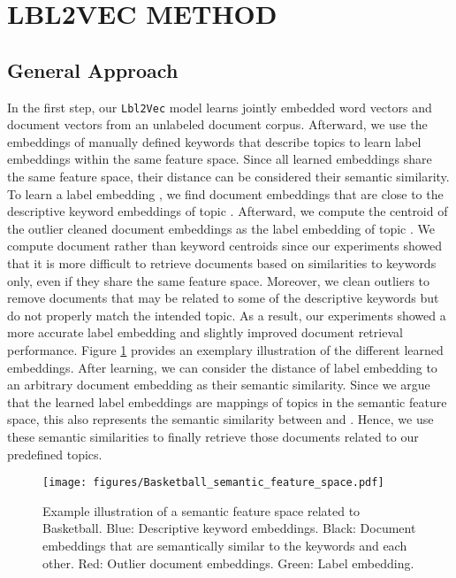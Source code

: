 \documentclass[a4paper,twoside]{article}
\begin{document}
\section{\uppercase{Lbl2Vec Method}}
\label{sec:lbl2vec_method}

\subsection{General Approach}

In the first step, our \texttt{Lbl2Vec} model learns jointly embedded word vectors  and document vectors  from an unlabeled document corpus. Afterward, we use the embeddings  of manually defined keywords that describe topics  to learn label embeddings  within the same feature space. Since all learned embeddings  share the same feature space, their distance can be considered their semantic similarity. To learn a label embedding , we find document embeddings  that are close to the descriptive keyword embeddings  of topic . Afterward, we compute the centroid of the outlier cleaned document embeddings as the label embedding  of topic . We compute document rather than keyword centroids since our experiments showed that it is more difficult to retrieve documents based on similarities to keywords only, even if they share the same feature space. Moreover, we clean outliers to remove documents that may be related to some of the descriptive keywords but do not properly match the intended topic. As a result, our experiments showed a more accurate label embedding and slightly improved document retrieval performance. Figure \ref{fig:basketball_feature_space} provides an exemplary illustration of the different learned embeddings. After learning, we can consider the distance of label embedding  to an arbitrary document embedding  as their semantic similarity. Since we argue that the learned label embeddings are mappings of topics in the semantic feature space, this also represents the semantic similarity between  and . Hence, we use these semantic similarities to finally retrieve those documents related to our predefined topics.
\begin{figure}[ht]
    \centering
    \texttt{[image: figures/Basketball\_semantic\_feature\_space.pdf]}
    \caption{Example illustration of a semantic feature space related to Basketball. Blue: Descriptive keyword embeddings. Black: Document embeddings that are semantically similar to the keywords and each other. Red: Outlier document embeddings. Green: Label embedding.}
    \label{fig:basketball_feature_space}
\end{figure}
\end{document}
